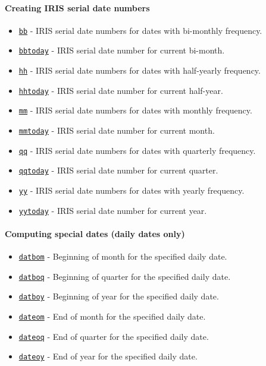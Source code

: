 

	\paragraph{Creating IRIS serial date numbers}
 
 \begin{itemize}
 \item
   \href{dates/bb}{\texttt{bb}} - IRIS serial date numbers for dates with
   bi-monthly frequency.
 \item
   \href{dates/bbtoday}{\texttt{bbtoday}} - IRIS serial date number for
   current bi-month.
 \item
   \href{dates/hh}{\texttt{hh}} - IRIS serial date numbers for dates with
   half-yearly frequency.
 \item
   \href{dates/hhtoday}{\texttt{hhtoday}} - IRIS serial date number for
   current half-year.
 \item
   \href{dates/mm}{\texttt{mm}} - IRIS serial date numbers for dates with
   monthly frequency.
 \item
   \href{dates/mmtoday}{\texttt{mmtoday}} - IRIS serial date number for
   current month.
 \item
   \href{dates/qq}{\texttt{qq}} - IRIS serial date numbers for dates with
   quarterly frequency.
 \item
   \href{dates/qqtoday}{\texttt{qqtoday}} - IRIS serial date number for
   current quarter.
 \item
   \href{dates/yy}{\texttt{yy}} - IRIS serial date numbers for dates with
   yearly frequency.
 \item
   \href{dates/yytoday}{\texttt{yytoday}} - IRIS serial date number for
   current year.
 \end{itemize}
 
 \paragraph{Computing special dates (daily dates only)}
 
 \begin{itemize}
 \item
   \href{dates/datbom}{\texttt{datbom}} - Beginning of month for the
   specified daily date.
 \item
   \href{dates/datboq}{\texttt{datboq}} - Beginning of quarter for the
   specified daily date.
 \item
   \href{dates/datboy}{\texttt{datboy}} - Beginning of year for the
   specified daily date.
 \item
   \href{dates/dateom}{\texttt{dateom}} - End of month for the specified
   daily date.
 \item
   \href{dates/dateoq}{\texttt{dateoq}} - End of quarter for the
   specified daily date.
 \item
   \href{dates/dateoy}{\texttt{dateoy}} - End of year for the specified
   daily date.
 \end{itemize}
 
